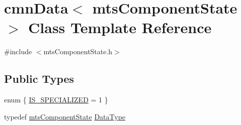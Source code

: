 \hypertarget{classcmn_data_3_01mts_component_state_01_4}{}\section{cmn\+Data$<$ mts\+Component\+State $>$ Class Template Reference}
\label{classcmn_data_3_01mts_component_state_01_4}


{\ttfamily \#include $<$mts\+Component\+State.\+h$>$}

\subsection*{Public Types}
\begin{DoxyCompactItemize}
\item 
enum \{ \hyperlink{classcmn_data_3_01mts_component_state_01_4_a11e79b0fc64762ffbb8003615449c9e4a7a0d2bba6c288f9c1bc16447bb9933f3}{I\+S\+\_\+\+S\+P\+E\+C\+I\+A\+L\+I\+Z\+E\+D} = 1
 \}
\item 
typedef \hyperlink{classmts_component_state}{mts\+Component\+State} \hyperlink{classcmn_data_3_01mts_component_state_01_4_a1f90216f34afbed70f7dbd34d33fafde}{Data\+Type}
\end{DoxyCompactItemize}
